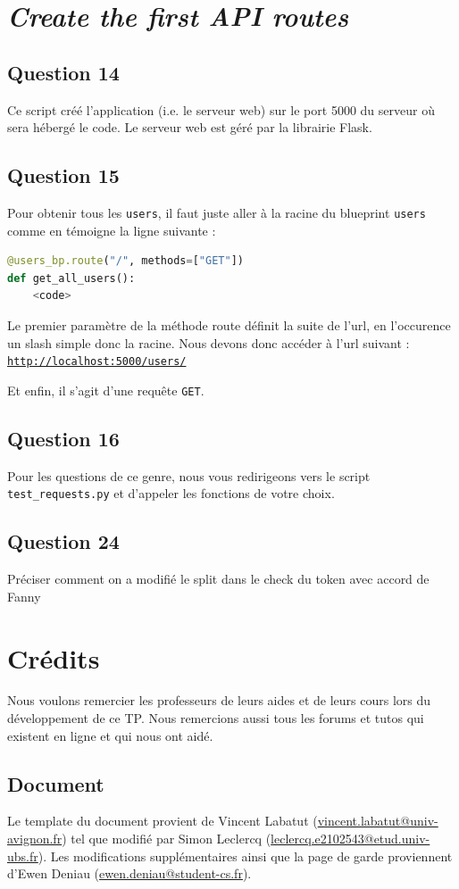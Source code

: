 \documentclass{ceri/sty/rapport}
\begin{document}
\section{\textit{Create the first API routes}}
\subsection{Question 14}
Ce script créé l'application (i.e. le serveur web) sur le port 5000 du serveur où sera hébergé le code. Le serveur web est géré par la librairie Flask.

\subsection{Question 15}
Pour obtenir tous les \texttt{users}, il faut juste aller à la racine du blueprint \texttt{users} comme en témoigne la ligne suivante :

\begin{lstlisting}[language=python]
@users_bp.route("/", methods=["GET"])
def get_all_users():
    <code>
\end{lstlisting}

Le premier paramètre de la méthode route définit la suite de l'url, en l'occurence un slash simple donc la racine. Nous devons donc accéder à l'url suivant : \texttt{\url{http://localhost:5000/users/}}

Et enfin, il s'agit d'une requête \texttt{GET}.

\subsection{Question 16}
Pour les questions de ce genre, nous vous redirigeons vers le script \texttt{test\_requests.py} et d'appeler les fonctions de votre choix.

\subsection{Question 24}
Préciser comment on a modifié le split dans le check du token avec accord de Fanny

\section{Crédits}
Nous voulons remercier les professeurs de leurs aides et de leurs cours lors du développement de ce TP.
Nous remercions aussi tous les forums et tutos qui existent en ligne et qui nous ont aidé.

\subsection{Document}
Le template du document provient de Vincent Labatut (\url{vincent.labatut@univ-avignon.fr}) tel que modifié par Simon Leclercq (\url{leclercq.e2102543@etud.univ-ubs.fr}).
Les modifications supplémentaires ainsi que la page de garde proviennent d'Ewen Deniau (\url{ewen.deniau@student-cs.fr}).

\nocite{*}
\end{document}

